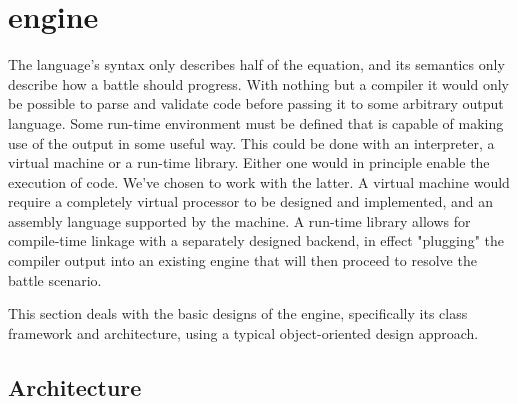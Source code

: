 \section{\langname{} engine}
The language's syntax only describes half of the equation, and its semantics only describe how a battle should progress. With nothing but a compiler it would only be possible to parse and validate code before passing it to some arbitrary output language. Some run-time environment must be defined that is capable of making use of the output in some useful way. This could be done with an interpreter, a virtual machine or a run-time library. Either one would in principle enable the execution of code. We've chosen to work with the latter. A virtual machine would require a completely virtual processor to be designed and implemented, and an assembly language supported by the machine. %
A run-time library allows for compile-time linkage with a separately designed backend, in effect "plugging" the \langname{} compiler output into an existing engine that will then proceed to resolve the battle scenario.

This section deals with the basic designs of the engine, specifically its class framework and architecture, using a typical object-oriented design approach.

\subsection*{Architecture}


